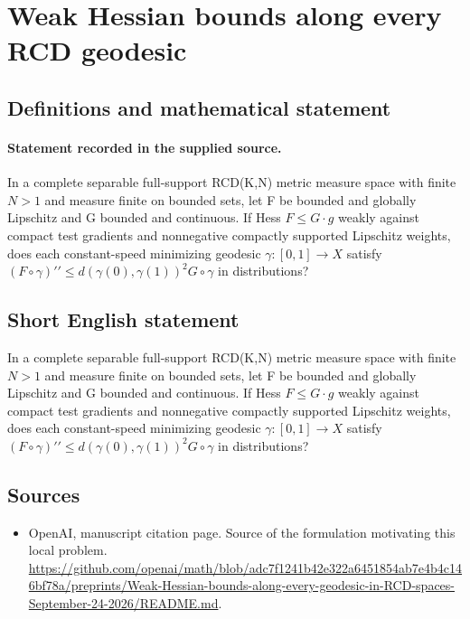 \documentclass[11pt]{article}
\begin{document}
\section*{Weak Hessian bounds along every RCD geodesic}\label{statement}
\subsection{Definitions and mathematical statement}
\paragraph{Statement recorded in the supplied source.}
In a complete separable full-support RCD(K,N) metric measure space with finite $N>1$ and measure finite on bounded sets, let F be bounded and globally Lipschitz and G bounded and continuous. If Hess $F\leq G\cdot g$ weakly against compact test gradients and nonnegative compactly supported Lipschitz weights, does each constant-speed minimizing geodesic $\gamma :[0,1]\to X$ satisfy $(F\circ \gamma )\prime\prime \leq d(\gamma (0),\gamma (1))^{2}G\circ \gamma $ in distributions?
\subsection{Short English statement}
In a complete separable full-support RCD(K,N) metric measure space with finite $N>1$ and measure finite on bounded sets, let F be bounded and globally Lipschitz and G bounded and continuous. If Hess $F\leq G\cdot g$ weakly against compact test gradients and nonnegative compactly supported Lipschitz weights, does each constant-speed minimizing geodesic $\gamma :[0,1]\to X$ satisfy $(F\circ \gamma )\prime\prime \leq d(\gamma (0),\gamma (1))^{2}G\circ \gamma $ in distributions?
\subsection{Sources}
\begin{itemize}
\item[S1] OpenAI, manuscript citation page. Source of the formulation motivating this local problem.
\url{https://github.com/openai/math/blob/adc7f1241b42e322a6451854ab7e4b4c146bf78a/preprints/Weak-Hessian-bounds-along-every-geodesic-in-RCD-spaces-September-24-2026/README.md}.
\end{itemize}
\end{document}
